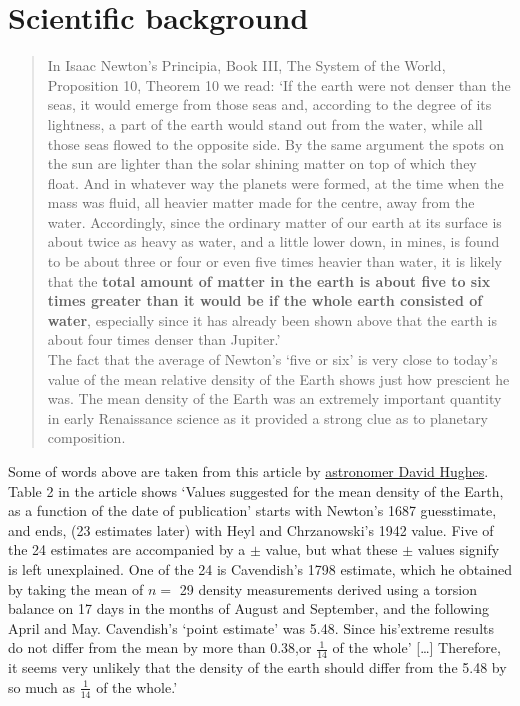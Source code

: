 \documentclass[]{book}
\begin{document}
\hypertarget{scientific-background}{%
\section{Scientific background}\label{scientific-background}}

\begin{quote}
In Isaac Newton's Principia, Book III, The System of the World, Proposition 10, Theorem 10 we read: `If the earth were not denser than the seas, it would emerge from those seas and, according to the degree of its lightness, a part of the earth would stand out from the water, while all those seas flowed to the opposite side. By the same argument the spots on the sun are lighter than the solar shining matter on top of which they float. And in whatever way the planets were formed, at the time when the mass was fluid, all heavier matter made for the centre, away from the water. Accordingly, since the ordinary matter of our earth at its surface is about twice as heavy as water, and a little lower down, in mines, is found to be about three or four or even five times heavier than water, it is likely that the \textbf{total amount of matter in the earth is about five to six times greater than it would be if the whole earth consisted of water}, especially since it has already been shown above that the earth is about four times denser than Jupiter.'\\
\hspace*{0.333em}\hspace*{0.333em}\hspace*{0.333em}\hspace*{0.333em}The fact that the average of Newton's `five or six' is very close to today's value of the mean relative density of the Earth shows just how prescient he was. The mean density of the Earth was an extremely important quantity in early Renaissance science as it provided a strong clue as to planetary composition.
\end{quote}

Some of words above are taken from this article by \href{http://www.biostat.mcgill.ca/hanley/statbook/DensityOfEarth.pdf}{astronomer David Hughes}.
Table 2 in the article shows `Values suggested for the mean density of the Earth, as a function of the date of publication' starts with Newton's 1687 guesstimate, and ends, (23 estimates later) with Heyl and Chrzanowski's 1942 value.
Five of the 24 estimates are accompanied by a \(\pm\) value, but what these \(\pm\) values signify is left unexplained. One of the 24 is Cavendish's 1798 estimate, which he obtained by taking the mean of \(n =\) 29 density measurements derived using a torsion balance on 17 days in the months of August and September, and the following April and May. Cavendish's `point estimate' was 5.48. Since his'extreme results do not differ from the mean by more than 0.38,or \(\frac{1}{14}\) of the whole' {[}\ldots{}{]} Therefore, it seems very unlikely that the density of the earth should differ from the 5.48 by so much as \(\frac{1}{14}\) of the whole.'
\end{document}

